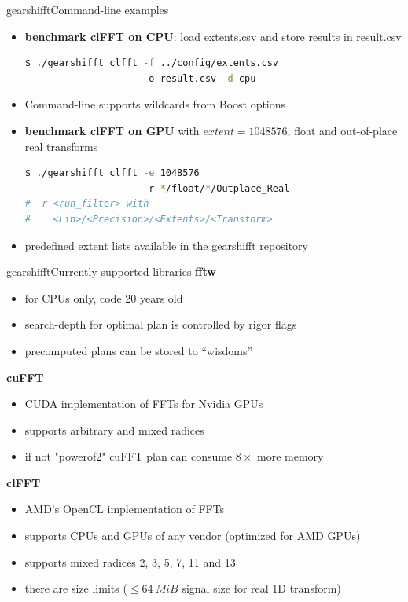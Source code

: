 \documentclass[t,11pt,hyperref={
  pdftitle = {gearshifft},
  pdfsubject = {gearshifft},
  pdfborder={0 0 0},
  colorlinks=true,
  urlcolor=red,
  citecolor=red,
  linkcolor=red,
  pdfauthor={Peter Steinbach, Matthias Werner}
  }
]{beamer}
\begin{document}
\begin{frame}[fragile]{gearshifft}{Command-line examples}
  \begin{itemize}[<+->]
\item 
\textbf{benchmark clFFT on CPU}: load extents.csv and store results in result.csv
\begin{lstlisting}[numbers=none,language=bash,basicstyle=\small\ttfamily,columns=fixed]
$ ./gearshifft_clfft -f ../config/extents.csv
                     -o result.csv -d cpu
\end{lstlisting}

\item Command-line supports wildcards from Boost options
\item 
\textbf{benchmark clFFT on GPU} with $extent=1048576$, float and out-of-place real transforms
\begin{lstlisting}[numbers=none,language=bash,basicstyle=\small\ttfamily,columns=fixed]
$ ./gearshifft_clfft -e 1048576
                     -r */float/*/Outplace_Real
# -r <run_filter> with 
#    <Lib>/<Precision>/<Extents>/<Transform>
\end{lstlisting}
\item \href{https://github.com/mpicbg-scicomp/gearshifft/tree/master/config}{predefined extent lists} available in the gearshifft repository
\end{itemize}  
\end{frame}


\begin{frame}{gearshifft}{Currently supported libraries}
  {\textbf{fftw}}
  \begin{itemize}
  \item for CPUs only, code 20 years old
  \item search-depth for optimal plan is controlled by rigor flags
  \item precomputed plans can be stored to ``wisdoms''
  \end{itemize}
\pause  
  {\textbf{cuFFT}} 
  \begin{itemize}
  \item CUDA implementation of FFTs for Nvidia GPUs
  \item supports arbitrary and mixed radices
  \item if not "powerof2" cuFFT plan can consume $8\times$ more memory
\end{itemize}
\pause
  {\textbf{clFFT}}
  \begin{itemize}
  \item AMD's OpenCL implementation of FFTs
  \item supports CPUs and GPUs of any vendor (optimized for AMD GPUs)
  \item supports mixed radices 2, 3, 5, 7, 11 and 13
  \item there are size limits ($\le\SI{64}{MiB}$ signal size for real 1D transform)
  \end{itemize}
  
\end{frame}
\end{document}
